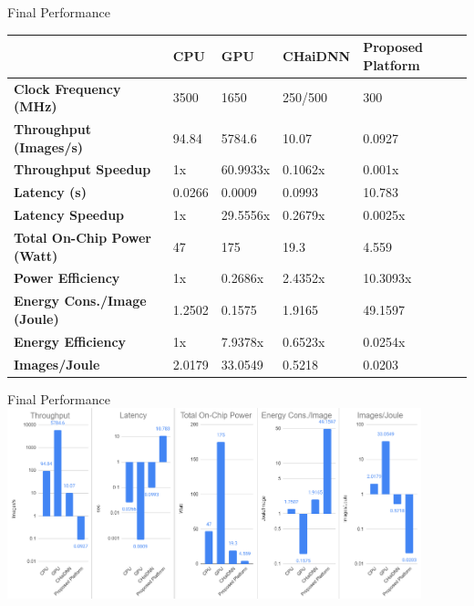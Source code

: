 \begin{frame}{Final Performance}
	\begin{table}[H]
		\centering
		\begin{tabular}{l|l|l|l|l}
			\toprule
			                                    & \textbf{CPU} & \textbf{GPU} & \textbf{CHaiDNN} & \textbf{Proposed Platform} \\
			\midrule
			\textbf{Clock Frequency (MHz)}      & 3500         & 1650         & 250/500          & 300                        \\
			\textbf{Throughput (Images/s)}      & 94.84        & 5784.6       & 10.07            & 0.0927                     \\
			\textbf{Throughput Speedup}         & 1x           & 60.9933x     & 0.1062x          & 0.001x                     \\
			\textbf{Latency (s)}                & 0.0266       & 0.0009       & 0.0993           & 10.783                     \\
			\textbf{Latency Speedup}            & 1x           & 29.5556x     & 0.2679x          & 0.0025x                    \\
			\textbf{Total On-Chip Power (Watt)} & 47           & 175          & 19.3             & 4.559                      \\
			\textbf{Power Efficiency}           & 1x           & 0.2686x      & 2.4352x          & 10.3093x                   \\
			\textbf{Energy Cons./Image (Joule)} & 1.2502       & 0.1575       & 1.9165           & 49.1597                    \\
			\textbf{Energy Efficiency}          & 1x           & 7.9378x      & 0.6523x          & 0.0254x                    \\
			\textbf{Images/Joule}               & 2.0179       & 33.0549      & 0.5218           & 0.0203                     \\
			\bottomrule
		\end{tabular}
	\end{table}
\end{frame}

\begin{frame}{Final Performance}
	\centering
	\includegraphics[width=0.9\textwidth]{../Images/Results/Final-Results-charts.png}\\
\end{frame}
